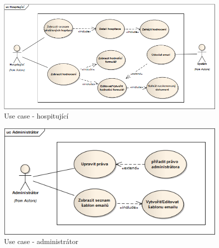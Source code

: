 \begin{figure}[H]
\begin{center}
\includegraphics[width=12cm]{figures/actor_observer}
\caption{Use case - hospitující}
\label{fig:actor_observer}
\end{center}
\end{figure}

\begin{figure}[H]
\begin{center}
\includegraphics[width=12cm]{figures/actor_root}
\caption{Use case - administrátor}
\label{fig:actor_root}
\end{center}
\end{figure}

